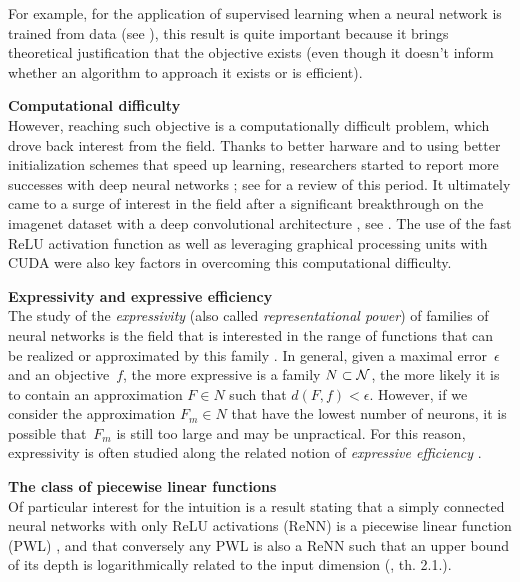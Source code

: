 For example, for the application of supervised learning when a neural network is trained from data (see ), this result is quite important because it brings theoretical justification that the objective exists (even though it doesn't inform whether an algorithm to approach it exists or is efficient).

\begin{remark}\textbf{Computational difficulty}\\
However, reaching such objective is a computationally difficult problem, which drove back interest from the field. Thanks to better harware and to using better initialization schemes that speed up learning, researchers started to report more successes with deep neural networks \citep{hinton2006fast,glorot2010understanding} ; see \citep{bengio2009learning} for a review of this period. It ultimately came to a surge of interest in the field after a significant breakthrough on the imagenet dataset \citep{deng2009imagenet} with a deep convolutional architecture \citep{krizhevsky2012imagenet}, see . The use of the fast ReLU activation function \citep{glorot2011deep} as well as leveraging graphical processing units with CUDA \citep{nickolls2008scalable} were also key factors in overcoming this computational difficulty.
\end{remark}

\begin{remark}\textbf{Expressivity and expressive efficiency}\\
The study of the \emph{expressivity} (also called \emph{representational power}) of families of neural networks is the field that is interested in the range of functions that can be realized or approximated by this family \citep{haastad1991power,pascanu2013number}. In general, given a maximal error~$\epsilon$ and an objective~$f$, the more expressive is a family $N \subset \mathcal{N}$, the more likely it is to contain an approximation $F \in N$ such that $d(F,f) < \epsilon$. However, if we consider the approximation $F_m \in N$ that have the lowest number of neurons, it is possible that~$F_m$ is still too large and may be unpractical. For this reason, expressivity is often studied along the related notion of \emph{expressive efficiency} \citep{delalleau2011shallow,cohen2018boosting}.
\label{rem:expr}
\end{remark}

\begin{remark}\textbf{The class of piecewise linear functions}\\
Of particular interest for the intuition is a result stating that a simply connected neural networks with only ReLU activations (ReNN) is a piecewise linear function (PWL) \citep{pascanu2013number,montufar2014number}, and that conversely any PWL is also a ReNN such that an upper bound of its depth is logarithmically related to the input dimension (\cite{arora2018understanding}, th. 2.1.).
\end{remark}

